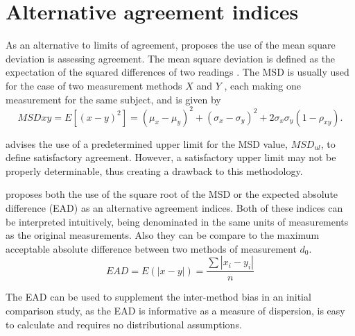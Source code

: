 \documentclass[12pt, a4paper]{report}
\theoremstyle{plain}
\theoremstyle{definition}
\theoremstyle{remark}
\begin{document}
	\section{Alternative agreement indices}
	As an alternative to limits of agreement, \citet{lin2002} proposes the use of
	the mean square deviation is assessing agreement. The mean square
	deviation is defined as the expectation of the squared differences
	of two readings . The MSD is usually used for the case of two
	measurement methods $X$ and $Y$ , each making one measurement for
	the same subject, and is given by
	\[
	MSDxy = E[(x - y)^2]  = (\mu_{x} - \mu_{y})^2 + (\sigma_{x} -
	\sigma_{y})^2 + 2\sigma_{x}\sigma_{y}(1-\rho_{xy}).
	\]
	
	
	\citet{Barnhart} advises the use of a predetermined upper limit
	for the MSD value, $MSD_{ul}$, to define satisfactory agreement.
	However, a satisfactory upper limit may not be properly
	determinable, thus creating a drawback to this methodology.
	
	
	\citet{Barnhart} proposes both the use of the square root of the
	MSD or the expected absolute difference (EAD) as an alternative agreement indices. Both of these indices can be interpreted intuitively, being denominated in the same units of measurements as the original
	measurements. Also they can be compare to the maximum acceptable
	absolute difference between two methods of measurement $d_{0}$.
	\[
	EAD = E(|x - y|) = \frac{\sum |x_{i}- y_{i}|}{n}
	\]
	
	The EAD can be used to supplement the inter-method bias in an
	initial comparison study, as the EAD is informative as a measure
	of dispersion, is easy to calculate and requires no distributional
	assumptions.
	
\end{document}

